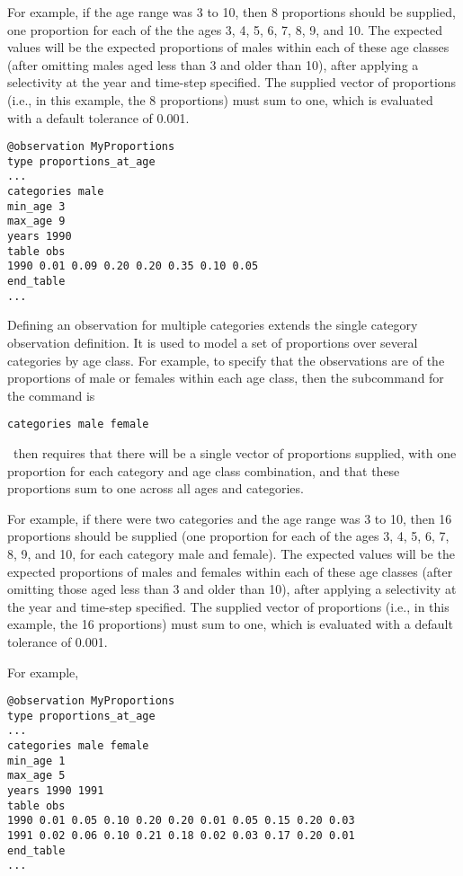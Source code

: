 For example, if the age range was 3 to 10, then 8 proportions should be supplied, one proportion for each of the the ages 3, 4, 5, 6, 7, 8, 9, and 10. The expected values will be the expected proportions of males within each of these age classes (after omitting males aged less than 3 and older than 10), after applying a selectivity at the year and time-step specified. The supplied vector of proportions (i.e., in this example, the 8 proportions) must sum to one, which is evaluated with a default tolerance of 0.001.

{\small{\begin{verbatim}
@observation MyProportions
type proportions_at_age
...
categories male
min_age 3
max_age 9
years 1990
table obs
1990 0.01 0.09 0.20 0.20 0.35 0.10 0.05
end_table
...
\end{verbatim}}}

Defining an observation for multiple categories extends the single category observation definition. It is used to model a set of proportions over several categories by age class. For example, to specify that the observations are of the proportions of male or females within each age class, then the subcommand  for the  command is

{\small{\begin{verbatim}
categories male female
\end{verbatim}}}

\CNAME\ then requires that there will be a single vector of proportions supplied, with one proportion for each category and age class combination, and that these proportions sum to one across all ages and categories.

For example, if there were two categories and the age range was 3 to 10, then 16 proportions should be supplied (one proportion for each of the ages 3, 4, 5, 6, 7, 8, 9, and 10, for each category male and female). The expected values will be the expected proportions of males and females within each of these age classes (after omitting those aged less than 3 and older than 10), after applying a selectivity at the year and time-step specified. The supplied vector of proportions (i.e., in this example, the 16 proportions) must sum to one, which is evaluated with a default tolerance of 0.001.

For example,

{\small{\begin{verbatim}
@observation MyProportions
type proportions_at_age
...
categories male female
min_age 1
max_age 5
years 1990 1991
table obs
1990 0.01 0.05 0.10 0.20 0.20 0.01 0.05 0.15 0.20 0.03
1991 0.02 0.06 0.10 0.21 0.18 0.02 0.03 0.17 0.20 0.01
end_table
...
\end{verbatim}}}

